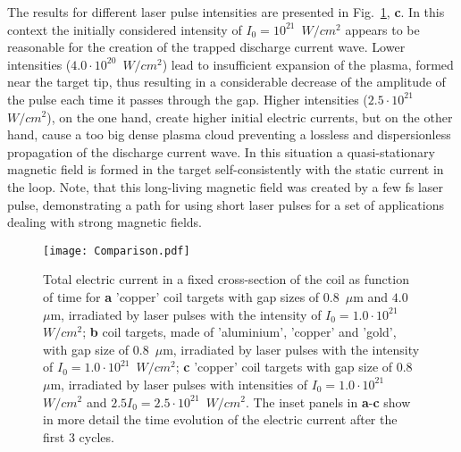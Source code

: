 \documentclass[aps,prl,twocolumn,superscriptaddress]{revtex4-1}
\begin{document}
The results for different laser pulse intensities are presented in Fig.~\ref{fig:comparison_I_t}, \textbf{c}. In this context the initially considered intensity of $I_0=10^{21}$~$W/cm^2$ appears to be reasonable for the creation of the trapped discharge current wave. Lower intensities ($4.0 \cdot 10^{20}$~$W/cm^2$) lead to insufficient expansion of the plasma, formed near the target tip, thus resulting in a considerable decrease of the amplitude of the pulse each time it passes through the gap. Higher intensities ($2.5 \cdot 10^{21}$~$W/cm^2$), on the one hand, create higher initial electric currents, but on the other hand, cause a too big dense plasma cloud preventing a lossless and dispersionless propagation of the discharge current wave. In this situation a quasi-stationary magnetic field is formed in the target self-consistently with the static current in the loop. Note, that this long-living magnetic field was created by a few fs laser pulse, demonstrating a path for using short laser pulses for a set of applications dealing with strong magnetic fields.
\begin{figure}
    \centering
    \texttt{[image: Comparison.pdf]}
    \caption{Total electric current in a fixed cross-section of the coil as function of time for \textbf{a} 'copper' coil targets with gap sizes of $0.8$~$\mu$m and $4.0$~$\mu$m, irradiated by laser pulses with the intensity of $I_0=1.0 \cdot 10^{21}$~$W/cm^2$; \textbf{b} coil targets, made of 'aluminium', 'copper' and 'gold', with gap size of $0.8$~$\mu$m, irradiated by laser pulses with the intensity of $I_0=1.0 \cdot 10^{21}$~$W/cm^2$; \textbf{c} 'copper' coil targets with gap size of $0.8$~$\mu$m, irradiated by laser pulses with intensities of $I_0=1.0 \cdot 10^{21}$~$W/cm^2$ and $2.5 I_0 = 2.5 \cdot 10^{21}$~$W/cm^2$. The inset panels in \textbf{a}-\textbf{c} show in more detail the time evolution of the electric current after the first 3 cycles.}
    \label{fig:comparison_I_t}
\end{figure}
\end{document}
